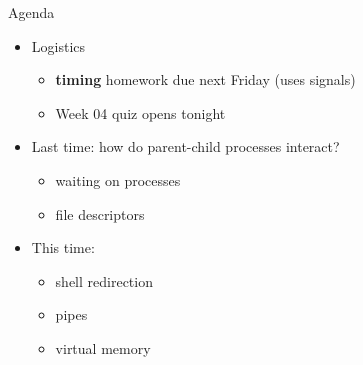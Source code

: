 \begin{frame}{Agenda}
    \begin{itemize}
        \item Logistics
            \begin{itemize}

            \item \textbf{timing} homework due next Friday (uses signals)
            \item Week 04 quiz opens tonight
            \end{itemize}

        \item Last time: how do parent-child processes interact?
            \begin{itemize}
                \item waiting on processes
                \item file descriptors
            \end{itemize}

        \item This time:
            \begin{itemize}
                \item shell redirection
                \item pipes
                \item virtual memory
            \end{itemize}

    \end{itemize}
\end{frame}